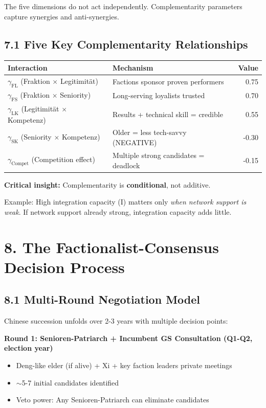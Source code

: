 \documentclass[11pt]{article}
\begin{document}
The five dimensions do not act independently. Complementarity parameters capture synergies and anti-synergies.

\subsection{7.1 Five Key Complementarity Relationships}

\begin{table}[h]
\centering
\begin{tabular}{|l|l|r|}
\hline
\textbf{Interaction} & \textbf{Mechanism} & \textbf{Value} \\
\hline
$\gamma_{\text{FL}}$ (Fraktion $\times$ Legitimität) & Factions sponsor proven performers & 0.75 \\
$\gamma_{\text{FS}}$ (Fraktion $\times$ Seniority) & Long-serving loyalists trusted & 0.70 \\
$\gamma_{\text{LK}}$ (Legitimität $\times$ Kompetenz) & Results + technical skill = credible & 0.55 \\
$\gamma_{\text{SK}}$ (Seniority $\times$ Kompetenz) & Older = less tech-savvy (NEGATIVE) & -0.30 \\
$\gamma_{\text{Compet}}$ (Competition effect) & Multiple strong candidates = deadlock & -0.15 \\
\hline
\end{tabular}
\end{table}

\textbf{Critical insight:} Complementarity is \textbf{conditional}, not additive.

Example: High integration capacity (Ι) matters only \textit{when network support is weak}. If network support already strong, integration capacity adds little.

\section{8. The Factionalist-Consensus Decision Process}

\subsection{8.1 Multi-Round Negotiation Model}

Chinese succession unfolds over 2-3 years with multiple decision points:

\textbf{Round 1: Senioren-Patriarch + Incumbent GS Consultation (Q1-Q2, election year)}
\begin{itemize}
\item Deng-like elder (if alive) + Xi + key faction leaders private meetings
\item $\sim$5-7 initial candidates identified
\item Veto power: Any Senioren-Patriarch can eliminate candidates
\end{itemize}
\end{document}
